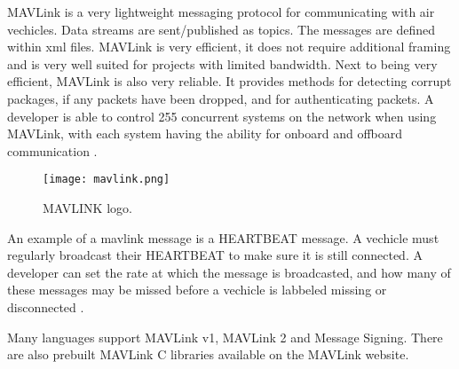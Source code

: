 
MAVLink is a very lightweight messaging protocol for communicating with air vechicles. Data streams are sent/published as topics.  
The messages are defined within \acs{xml} files. MAVLink is very efficient, it does not require additional framing and is very well 
suited for projects with limited bandwidth. Next to being very efficient, MAVLink is also very reliable. It provides methods for 
detecting corrupt packages, if any packets have been dropped, and for authenticating packets. A developer is able to control 255 concurrent 
systems on the network when using MAVLink, with each system having the ability for onboard and offboard communication \cite{mavlink:about}.

\begin{figure}[ht]
    \centering
    \texttt{[image: mavlink.png]}
    \caption[MAVLINK logo]{MAVLINK logo\footnotemark.}
\end{figure}

An example of a mavlink message is a HEARTBEAT message. A vechicle must regularly broadcast their HEARTBEAT to make sure it is still connected. 
A developer can set the rate at which the message is broadcasted, and how many of these messages may be missed before a vechicle is labbeled missing 
or disconnected \cite{mavlink:heartbeat}.

Many languages support MAVLink v1, MAVLink 2 and Message Signing. There are also prebuilt MAVLink C libraries available on the MAVLink website.

